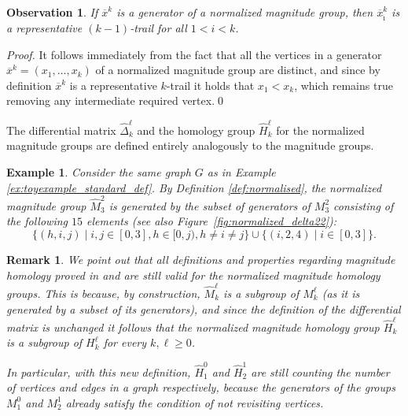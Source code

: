 \documentclass{article}
\newtheorem{example}{Example}
\newtheorem{remark}{Remark}
\newtheorem{observation}{Observation}
\begin{document}
	\begin{observation}\label{obs:representatives}
		If $\overline{x}^k$ is a generator of a normalized magnitude group, then $\overline{x}^k_{\hat{\imath}}$ is a representative $(k-1)$-trail for all $1<i<k$. 
	\end{observation}
	\begin{proof}
		It follows immediately from the fact that all the vertices in a generator $\overline{x}^k=(x_1,\ldots,x_k)$ of a normalized magnitude group are distinct, and since by definition $\overline{x}^k$ is a representative $k$-trail it holds that $x_1<x_k$, which remains true removing any intermediate required vertex.\qed
	\end{proof}
	
	The differential matrix $\widehat{\Delta}_k^\ell$ and the homology group $\widehat{H}_k^\ell$ for the normalized magnitude groups are defined entirely analogously to the magnitude groups.
	
	\begin{example}\label{ex:normalised_groups}
		Consider the same graph $G$ as in Example \ref{ex:toyexample_standard_def}.
		By Definition \ref{def:normalised}, the normalized magnitude group $\widehat{M}_{3}^{2}$ is generated by the subset of generators of $M_3^2$ consisting of the following $15$ elements (see also Figure~\ref{fig:normalized_delta22}): 
		$$\{(h,i,j)\mid i,j\in[0,3], h\in[0,j),h\neq i\neq j\}\cup \{(i,2,4)\mid i\in[0,3]\}.$$
	\end{example}
	
	\begin{remark}
		\label{NMHsubgroup}
		We point out that all definitions and properties regarding magnitude homology proved in \cite{hepworth2015categorifying} and \cite{leinster2021magnitude} are still valid for the normalized magnitude homology groups.
		This is because, by construction, $\widehat{M}_k^{\ell}$ is a subgroup of $M_k^{\ell}$ (as it is generated by a subset of its generators), and since the definition of the differential matrix is unchanged it follows that the normalized magnitude homology group $\widehat{H}_k^{\ell}$ is a subgroup of  $H_k^{\ell}$ for every $k,\ell\geq 0$.
		
		In particular, with this new definition, $\widehat{H}_1^{0}$ and $\widehat{H}_2^1$ are still counting the number of vertices and edges in a graph respectively, because the generators of the groups $M_1^0$ and $M_2^1$ already satisfy the condition of not revisiting vertices.
	\end{remark}
	
\end{document}
